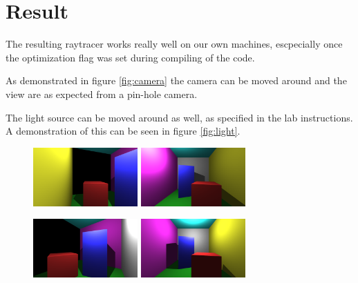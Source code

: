 \documentclass[a4paper]{article}
\begin{document}
\section{Result}
The resulting raytracer works really well on our own machines, escpecially once
the optimization flag was set during compiling of the code. 

As demonstrated in figure \ref{fig:camera} the camera can be moved around and
the view are as expected from a pin-hole camera.

The light source can be moved around as well, as specified in the lab instructions. A
demonstration of this can be seen in figure \ref{fig:light}.

\begin{figure}[H]
    \centering
    \begin{minipage}{.5\textwidth}
        \centering
        \includegraphics[width=4cm]{720ani0.png}
    \end{minipage}%
    \begin{minipage}{.5\textwidth}
        \centering
        \includegraphics[width=4cm]{light0.png}
    \end{minipage}
\end{figure}

\begin{figure}[H]
    \centering
    \begin{minipage}{.5\textwidth}
        \centering
        \includegraphics[width=4cm]{720ani1.png}
    \end{minipage}%
    \begin{minipage}{.5\textwidth}
        \centering
        \includegraphics[width=4cm]{light1.png}
    \end{minipage}
\end{figure}
\end{document}
